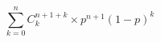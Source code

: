 \documentclass{article}
\begin{document}
\fontsize{15pt}{20pt}\selectfont

\begin{displaymath}
\sum_{k=0}^{n} C_{k}^{n+1+k} \times p^{n+1}(1-p)^k
\end{displaymath}
\end{document}
